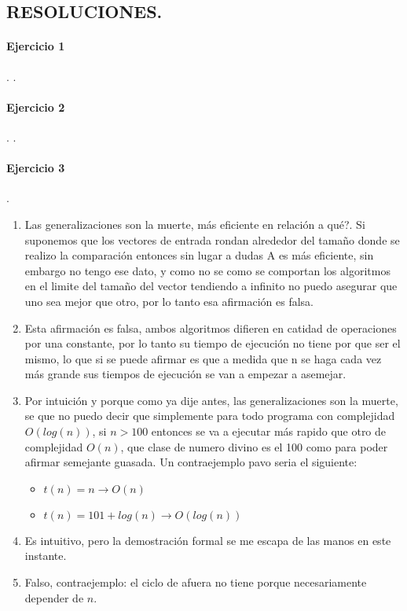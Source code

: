 \documentclass{article}
\begin{document}


\begin{center}
\section*{RESOLUCIONES.}
\end{center}
\paragraph{Ejercicio 1}.
.
\paragraph{Ejercicio 2}.
.
\paragraph{Ejercicio 3}.
\begin{enumerate}[label=\alph*)]
\item  Las generalizaciones son la muerte, más eficiente en relación a qué?.
 Si suponemos que los vectores de entrada rondan alrededor del tamaño donde se realizo la comparación
  entonces sin lugar a dudas A es más eficiente, sin embargo no tengo ese dato, y como no se como se comportan los algoritmos
   en el limite del tamaño del vector tendiendo a infinito no puedo asegurar que uno sea mejor que otro, por lo tanto esa afirmación es falsa.
\item Esta afirmación es falsa, ambos algoritmos difieren en catidad de operaciones por una constante, por lo tanto su tiempo de ejecución no tiene por que ser el mismo, lo que si se puede afirmar es que a medida que n se haga cada vez más grande sus tiempos de ejecución se van a empezar a asemejar.
\item Por intuición y porque como ya dije antes, las generalizaciones son la muerte, se que no puedo decir que simplemente para todo programa con complejidad $O(log(n))$, si $n>100$ entonces se va a ejecutar más rapido que otro de complejidad $O(n)$, que clase de numero divino es el 100 como para poder afirmar semejante guasada. Un contraejemplo pavo seria el siguiente:
\begin{itemize}
\item $t(n)= n \rightarrow O(n)$
\item $t(n)= 101+log(n) \rightarrow O(log(n))$
\end{itemize}
\item Es intuitivo, pero la demostración formal se me escapa de las manos en este instante.
\item Falso, contraejemplo: el ciclo de afuera no tiene porque necesariamente depender de $n$.
\end{enumerate}
\end{document}
